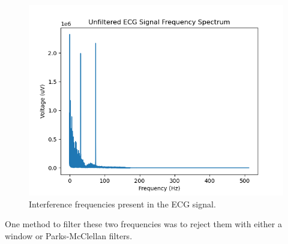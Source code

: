 \documentclass[a4paper, 11pt]{article}
\begin{document}
        \begin{figure}[h!]
            \centering
            \graphicspath{{./wiki/}}
            \includegraphics[scale=0.6]{ECG_freq_spectrum.png}
            \caption{Interference frequencies present in the ECG signal.}
            \label{Fig:rejFreq}
        \end{figure}

        One method to filter these two frequencies was to reject them with either a window or Parks-McClellan filters.
\end{document}
